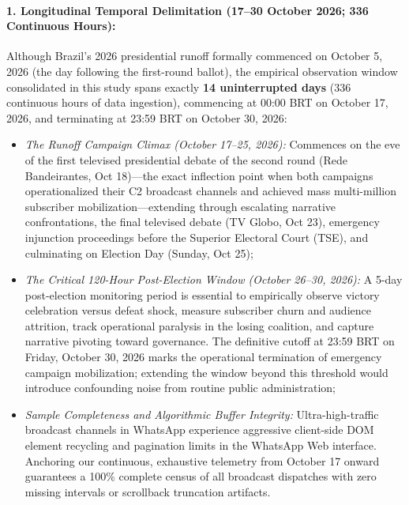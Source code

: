 \documentclass[preprint,12pt]{elsarticle}
\begin{document}
\paragraph{1. Longitudinal Temporal Delimitation (17--30 October 2026; 336 Continuous Hours):}
Although Brazil's 2026 presidential runoff formally commenced on October 5, 2026 (the day following the first-round ballot), the empirical observation window consolidated in this study spans exactly \textbf{14 uninterrupted days} (336 continuous hours of data ingestion), commencing at 00:00 BRT on October 17, 2026, and terminating at 23:59 BRT on October 30, 2026:
\begin{itemize}
    \item \textit{The Runoff Campaign Climax (October 17--25, 2026):} Commences on the eve of the first televised presidential debate of the second round (Rede Bandeirantes, Oct 18)---the exact inflection point when both campaigns operationalized their C2 broadcast channels and achieved mass multi-million subscriber mobilization---extending through escalating narrative confrontations, the final televised debate (TV Globo, Oct 23), emergency injunction proceedings before the Superior Electoral Court (TSE), and culminating on Election Day (Sunday, Oct 25);
    \item \textit{The Critical 120-Hour Post-Election Window (October 26--30, 2026):} A 5-day post-election monitoring period is essential to empirically observe victory celebration versus defeat shock, measure subscriber churn and audience attrition, track operational paralysis in the losing coalition, and capture narrative pivoting toward governance. The definitive cutoff at 23:59 BRT on Friday, October 30, 2026 marks the operational termination of emergency campaign mobilization; extending the window beyond this threshold would introduce confounding noise from routine public administration;
    \item \textit{Sample Completeness and Algorithmic Buffer Integrity:} Ultra-high-traffic broadcast channels in WhatsApp experience aggressive client-side DOM element recycling and pagination limits in the WhatsApp Web interface. Anchoring our continuous, exhaustive telemetry from October 17 onward guarantees a 100\% complete census of all broadcast dispatches with zero missing intervals or scrollback truncation artifacts.
\end{itemize}
\end{document}
